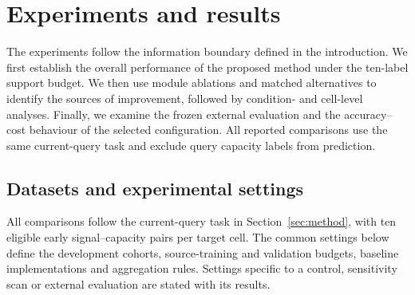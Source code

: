 \documentclass[preprint,12pt]{elsarticle}
\begin{document}
\section{Experiments and results}
\label{sec:experiments}
The experiments follow the information boundary defined in the introduction. We first establish the overall performance of the proposed method under the ten-label support budget. We then use module ablations and matched alternatives to identify the sources of improvement, followed by condition- and cell-level analyses. Finally, we examine the frozen external evaluation and the accuracy--cost behaviour of the selected configuration. All reported comparisons use the same current-query task and exclude query capacity labels from prediction.

\subsection{Datasets and experimental settings}
All comparisons follow the current-query task in Section~\ref{sec:method}, with ten eligible early signal--capacity pairs per target cell. The common settings below define the development cohorts, source-training and validation budgets, baseline implementations and aggregation rules. Settings specific to a control, sensitivity scan or external evaluation are stated with its results.
\end{document}
